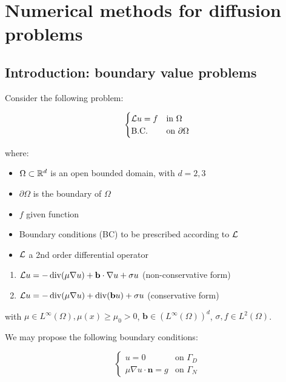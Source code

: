 \chapter{Numerical methods for diffusion problems}

\section{Introduction: boundary value problems}

Consider the following problem:

\begin{equation}
\begin{cases}
    \mathcal{L} u = f & \text{in } \Omega \\
    \text{B.C.} & \text{on } \partial \Omega
\end{cases}
\end{equation}

where:
\begin{itemize}
    \item $\Omega \subset \mathbb{R}^d$ is an open bounded domain, with $d = 2, 3$
    \item $\partial \Omega$ is the boundary of $\Omega$
    \item $f$ given function
    \item Boundary conditions (BC) to be prescribed according to $\mathcal{L}$
    \item $\mathcal{L}$ a 2nd order differential operator
\end{itemize}

\begin{example}
    \begin{enumerate}
        \item $\mathcal{L} u = -\operatorname{div}(\mu \nabla u) + \mathbf{b} \cdot \nabla u + \sigma u$ (non-conservative form)
        \item $\mathcal{L} u = -\operatorname{div}(\mu \nabla u) + \operatorname{div}(\mathbf{b} u) + \sigma u$ (conservative form)
    \end{enumerate}

    with $\mu \in L^{\infty}(\Omega), \mu(x) \geq \mu_0 > 0$, $\mathbf{b} \in (L^{\infty}(\Omega))^d$, $\sigma, f \in L^{2}(\Omega)$.
\end{example}

We may propose the following boundary conditions:

\begin{equation}
    \begin{cases}
        u = 0 & \text{on } \Gamma_D \\
        \mu \nabla u \cdot \mathbf{n} = g & \text{on } \Gamma_N
    \end{cases}
\end{equation}

